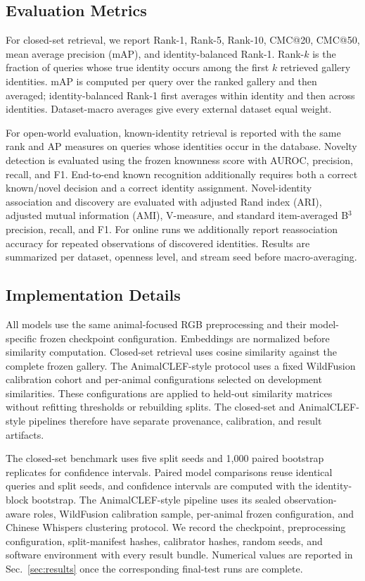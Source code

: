 \subsection{Evaluation Metrics}
\label{sec:experiments:metrics}

For closed-set retrieval, we report Rank-1, Rank-5, Rank-10, CMC@20, CMC@50,
mean average precision (mAP), and identity-balanced Rank-1. Rank-$k$ is the
fraction of queries whose true identity occurs among the first $k$ retrieved
gallery identities. mAP is computed per query over the ranked gallery and
then averaged; identity-balanced Rank-1 first averages within identity and
then across identities. Dataset-macro averages give every external dataset
equal weight.

For open-world evaluation, known-identity retrieval is reported with the same
rank and AP measures on queries whose identities occur in the database.
Novelty detection is evaluated using the frozen knownness score with AUROC,
precision, recall, and F1. End-to-end known recognition additionally requires
both a correct known/novel decision and a correct identity assignment.
Novel-identity association and discovery are evaluated with adjusted Rand
index (ARI), adjusted mutual information (AMI), V-measure, and standard
item-averaged B$^3$ precision, recall, and F1. For online runs we additionally
report reassociation accuracy for repeated observations of discovered
identities. Results are summarized per dataset, openness level, and stream
seed before macro-averaging.

\subsection{Implementation Details}
\label{sec:experiments:implementation}

All models use the same animal-focused RGB preprocessing and their
model-specific frozen checkpoint configuration. Embeddings are normalized
before similarity computation. Closed-set retrieval uses cosine similarity
against the complete frozen gallery. The AnimalCLEF-style protocol uses a
fixed WildFusion calibration cohort and per-animal configurations selected on
development similarities. These configurations are applied to held-out
similarity matrices without refitting thresholds or rebuilding splits. The
closed-set and AnimalCLEF-style pipelines therefore have separate provenance,
calibration, and result artifacts.

The closed-set benchmark uses five split seeds and 1,000 paired bootstrap
replicates for confidence intervals. Paired model comparisons reuse identical
queries and split seeds, and confidence intervals are computed with the
identity-block bootstrap. The AnimalCLEF-style pipeline uses its sealed
observation-aware roles, WildFusion calibration sample, per-animal frozen
configuration, and Chinese Whispers clustering protocol.
We record the checkpoint, preprocessing configuration, split-manifest hashes,
calibrator hashes, random seeds, and software environment with every result
bundle. Numerical values are reported in Sec.~\ref{sec:results} once the
corresponding final-test runs are complete.
